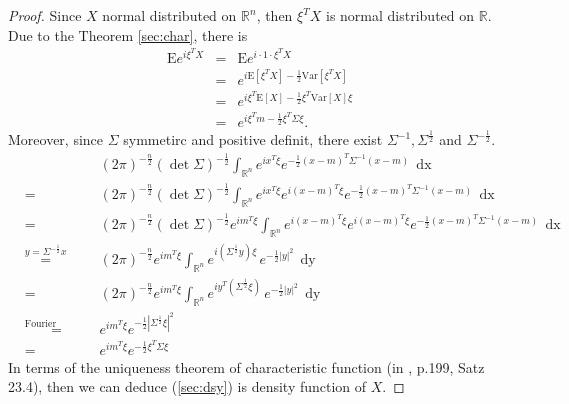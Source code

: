 \documentclass[a4paper, twoside, 11pt]{article}
\theoremstyle{definition}
\newcommand{\sqbr}[1]{\left[ {#1} \right]}
\begin{document}
\begin{proof}
  Since $X$ normal distributed on $\mathbb{R}^{n}$, then $\xi^T X$ is normal distributed on $\mathbb{R}$. Due to the Theorem \ref{sec:char}, there is
  \begin{eqnarray*}
	\mathrm{E} e^{i\xi^T X} &=& \mathrm{E} e^{i\cdot 1 \cdot \xi^T X}\\
	                        &=& e^{i\mathrm{E}\sqbr{\xi^T X} -\frac{1}{2}\mathrm{Var}\sqbr{\xi^T X}}\\
							&=& e^{i\xi^T\mathrm{E}\sqbr{X} - \frac{1}{2}\xi^T \mathrm{Var}\sqbr{X} \xi}\\
						    &=& e^{i\xi^Tm - \frac{1}{2}\xi^T \Sigma \xi}.
  \end{eqnarray*}
  Moreover, since $\Sigma$ symmetirc and positive definit, there exist $\Sigma^{-1}, \Sigma^{\frac{1}{2}}$ and $\Sigma^{-\frac{1}{2}}$.
  \begin{eqnarray*}
	&&(2\pi)^{-\frac{n}{2}} (\det\Sigma) ^{-\frac{1}{2}}\int_{\mathbb{R}^{n}} e^{i x^T \xi}e^{-\frac{1}{2}(x-m)^T\Sigma^{-1}(x-m)}\, \mathop{dx}\\
	&=& (2\pi)^{-\frac{n}{2}} (\det\Sigma) ^{-\frac{1}{2}}\int_{\mathbb{R}^{n}} e^{ix^T\xi} e^{i (x-m)^T \xi}e^{-\frac{1}{2}(x-m)^T\Sigma^{-1}(x-m)}\, \mathop{dx} \\
	&=& (2\pi)^{-\frac{n}{2}} (\det\Sigma) ^{-\frac{1}{2}}  e^{im^T\xi} \int_{\mathbb{R}^{n}} e^{i(x-m)^T\xi} e^{i (x-m)^T \xi}e^{-\frac{1}{2}(x-m)^T\Sigma^{-1}(x-m)}\, \mathop{dx} \\
	&\overset{y=\Sigma^{-\frac{1}{2}}x}{=}& (2\pi)^{-\frac{n}{2}} e^{im^T\xi} \int_{\mathbb{R}^{n}}e^{i (\Sigma^{\frac{1}{2}}y) \xi}\,e^{-\frac{1}{2}|y|^2}\, \mathop{dy}\\
	&=& (2\pi)^{-\frac{n}{2}} e^{im^T\xi}  \int_{\mathbb{R}^{n}}e^{i y^T (\Sigma^{\frac{1}{2}}\xi)}\,e^{-\frac{1}{2}|y|^2}\, \mathop{dy}\\
	&\overset{\text{Fourier transformation}}{=}& e^{im^T\xi}  e^{-\frac{1}{2}|\Sigma^{\frac{1}{2}}\xi|^2}\\
	&=& e^{im^T\xi}  e^{-\frac{1}{2}\xi^T\Sigma\xi}
  \end{eqnarray*}
  In terms of the uniqueness theorem of characteristic function (in \cite{bauer}, p.199, Satz 23.4), then we can deduce (\ref{sec:dsy}) is density function of $X$.
\end{proof}
\end{document}
